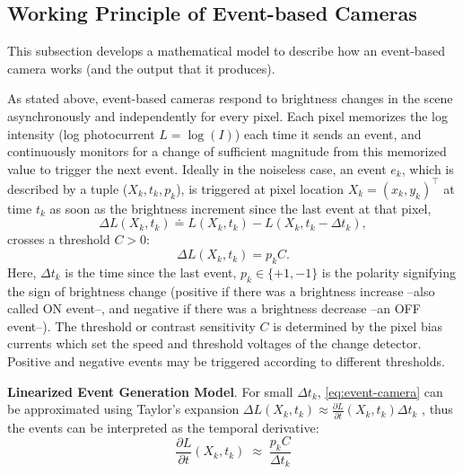 \documentclass[10pt]{report}
\begin{document}
\subsection{Working Principle of Event-based Cameras}
\label{sec:working-principle-events}
This subsection develops a mathematical model to describe how an event-based camera works (and the output that it produces). 

As stated above, event-based cameras respond to brightness changes in the scene asynchronously and independently for every pixel. 
Each pixel memorizes the log intensity (log photocurrent $L = \log(I)$) each time it sends an event, and continuously monitors for a change of sufficient magnitude from this memorized value to trigger the next event. 
Ideally in the noiseless case, an event $e_{k}$, which is described by a tuple ($X_{k},t_{k},p_{k}$), 
is triggered at pixel location $X_{k} = (x_{k},y_{k})^{\top}$ at time $t_{k}$ as soon as the brightness increment since the last event at that pixel, 
\begin{equation}
  \Delta L(X_{k},t_{k}) \doteq L(X_{k},t_{k}) - L(X_{k},t_{k} - \Delta t_{k}),
  \label{eq:event-camera}
\end{equation}
crosses a threshold $C>0$:
\begin{equation}
    \Delta L(X_{k},t_{k}) = p_{k} C.
    \label{eq:threshold}
\end{equation}
Here, $\Delta t_{k}$ is the time since the last event, $p_{k} \in \{+1,-1\}$ is the polarity signifying the sign of brightness change \cite{Lichtsteiner08ssc}
(positive if there was a brightness increase --also called ON event--, and negative if there was a brightness decrease --an OFF event--). 
The threshold or contrast sensitivity $C$ is determined by the pixel bias currents \cite{Xu17cvpr,Nozaki17ted} which set the speed and threshold
voltages of the change detector. 
Positive and negative events may be triggered according to different thresholds. 

\textbf{Linearized Event Generation Model}. 
For small $\Delta t_{k}$, \autoref{eq:event-camera} can be approximated using Taylor's expansion $\Delta L(X_{k},t_{k}) \approx \frac{\partial L}{\partial t}(X_{k},t_{k}) \Delta t_{k}$ , thus the events can be interpreted as the temporal derivative: 
\begin{equation}
    \frac{\partial L}{\partial t} (X_{k},t_{k}) \;\approx\; \frac{p_{k}C}{\Delta t_{k}}
\end{equation}
\end{document}
